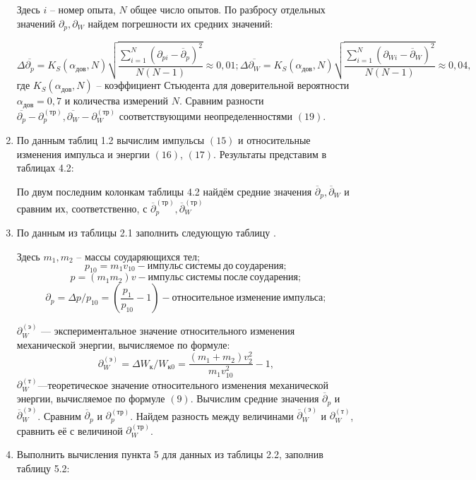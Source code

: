 \documentclass[12pt]{article}
\begin{document}
\begin{enumerate}
Здесь $i$ – номер опыта, $N$ общее число опытов. По разбросу отдельных значений
$\partial_{p},\partial_{W}$ найдем погрешности их средних значений:

\begin{equation}
\Delta \overline{\partial_{p}} = K_{S}(\alpha_{дов}, N) \sqrt{ \frac{\sum_{i=1}^N(\partial_{pi}-\overline{\partial}_{p})^2}{N(N-1)}} \approx 0,01;
\Delta \overline{\partial_{W}} = K_{S}(\alpha_{дов}, N) \sqrt{ \frac{\sum_{i=1}^N(\partial_{Wi}-\overline{\partial}_{W})^2}{N(N-1)}} \approx 0,04,
\end{equation}
где $K_{S}(\alpha_{дов}, N)$ – коэффициент Стьюдента для доверительной вероятности
$\alpha_{дов}= 0,7$ и количества измерений $N$. Сравним разности $\overline{\partial_{p}} -\partial^{(тр)}_{p},\overline{\partial_{W}} -\partial^{(тр)}_{W}$
соответствующими неопределенностями $(19)$.
\item По данным таблиц 1.2 вычислим импульсы $(15)$ и относительные
изменения импульса и энергии $(16)$, $(17)$. Результаты представим в таблицах
4.2:


По двум последним колонкам таблицы 4.2
найдём средние значения $\overline{\partial}_{p}, \overline{\partial}_{W}$ и сравним их, соответственно, с $\overline{\partial}^{(тр)}_{p}, \overline{\partial}^{(тр)}_{W}$
\item По данным из таблицы 2.1 заполнить следующую таблицу .

Здесь $m_{1}, m_{2}$ – массы соударяющихся тел;
\begin{equation}
p_{10}= m_{1}v_{10} -импульс\: системы\: до\: соударения; 
\end{equation}
\begin{equation}
p = (m_{1} m_{2})v - импульс\: системы \:после\: соударения;
\end{equation}
\begin{equation}
\partial_{p} = \Delta p/ p_{10} = (\frac{p_{1}}{p_{10}} -1)  - относительное\: изменение\: импульса;
\end{equation}

$\partial^{(э)}_{W}$ --- экспериментальное значение относительного изменения механической
энергии, вычисляемое по формуле:
\begin{equation}
\partial^{(э)}_{W} = \Delta W_{к}/ W_{к0} = \frac{(m_{1}+m_{2})v^2_{2}}{m_{1}v^2_{10}} - 1,
\end{equation}
$\partial^{(т)}_{W}$---теоретическое значение относительного изменения механической
энергии, вычисляемое по формуле $(9)$. Вычислим средние значения $\overline{\partial}_{p}$ и $\overline{\partial}^{(э)}_{W}$. Сравним
$\overline{\partial}_{p}$ и $\partial^{(тр)}_{p}$. Найдем разность между величинами $\overline{\partial}^{(э)}_{W}$ и $\partial^{(т)}_{W}$, сравнить её с величиной $\partial^{(тр)}_{W}$.
\item Выполнить вычисления пункта 5 для данных из таблицы 2.2, заполнив
таблицу 5.2:
\end{enumerate}
\end{document}
